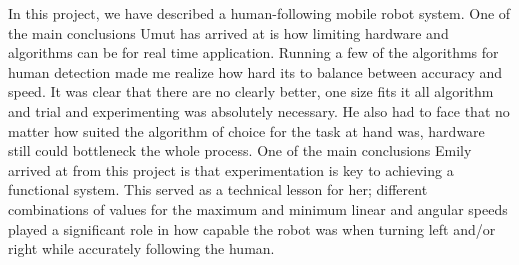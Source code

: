 \documentclass{ndjflart}
\theoremstyle{definition}
\theoremstyle{remark}
\begin{document}
In this project, we have described a human-following mobile robot system. One of the main conclusions Umut has arrived at is how limiting hardware and algorithms can be for real time application. Running a few of the algorithms for human detection made me realize how hard its to balance between accuracy and speed. It was clear that there are no clearly better, one size fits it all algorithm and trial and experimenting was absolutely necessary. He also had to face that no matter how suited the algorithm of choice for the task at hand was, hardware still could bottleneck the whole process. One of the main conclusions Emily arrived at from this project is that experimentation is key to achieving a functional system. This served as a technical lesson for her; different combinations of values for the maximum and minimum linear and angular speeds played a significant role in how capable the robot was when turning left and/or right while accurately following the human. 
\end{document}
